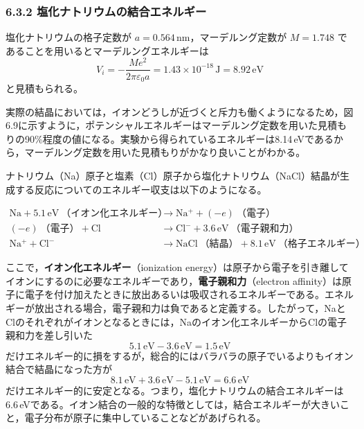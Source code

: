 \documentclass[a4paper,11pt]{ltjsarticle}
\begin{document}
\subsubsection{6.3.2 塩化ナトリウムの結合エネルギー}

塩化ナトリウムの格子定数が $a = 0.564\,\mathrm{nm}$，マーデルング定数が $M = 1.748$ であることを用いるとマーデルングエネルギーは
\begin{equation}
V_i = -\frac{Me^2}{2\pi\varepsilon_0 a} = 1.43\times10^{-18}\,\mathrm{J} = 8.92\,\mathrm{eV}
\end{equation}
と見積もられる。

実際の結晶においては，イオンどうしが近づくと斥力も働くようになるため，図6.9に示すように，ポテンシャルエネルギーはマーデルング定数を用いた見積もりの90\%程度の値になる。実験から得られているエネルギーは8.14\,eVであるから，マーデルング定数を用いた見積もりがかなり良いことがわかる。

ナトリウム（Na）原子と塩素（Cl）原子から塩化ナトリウム（NaCl）結晶が生成する反応についてのエネルギー収支は以下のようになる。

\begin{align*}
\mathrm{Na} + 5.1\,\mathrm{eV}\ \text{（イオン化エネルギー）} &\rightarrow \mathrm{Na^+} + (-e)\ \text{（電子）}\\
(-e)\ \text{（電子）} + \mathrm{Cl} &\rightarrow \mathrm{Cl^-} + 3.6\,\mathrm{eV}\ \text{（電子親和力）}\\
\mathrm{Na^+} + \mathrm{Cl^-} &\rightarrow \mathrm{NaCl}\ \text{（結晶）} + 8.1\,\mathrm{eV}\ \text{（格子エネルギー）}
\end{align*}

ここで，\textbf{イオン化エネルギー}（ionization energy）は原子から電子を引き離してイオンにするのに必要なエネルギーであり，\textbf{電子親和力}（electron affinity）は原子に電子を付け加えたときに放出あるいは吸収されるエネルギーである。エネルギーが放出される場合，電子親和力は負であると定義する。したがって，NaとClのそれぞれがイオンとなるときには，Naのイオン化エネルギーからClの電子親和力を差し引いた
\begin{equation}
5.1\,\mathrm{eV} - 3.6\,\mathrm{eV} = 1.5\,\mathrm{eV}
\end{equation}
だけエネルギー的に損をするが，総合的にはバラバラの原子でいるよりもイオン結合で結晶になった方が
\begin{equation}
8.1\,\mathrm{eV} + 3.6\,\mathrm{eV} - 5.1\,\mathrm{eV} = 6.6\,\mathrm{eV}
\end{equation}
だけエネルギー的に安定となる。つまり，塩化ナトリウムの結合エネルギーは6.6\,eVである。イオン結合の一般的な特徴としては，結合エネルギーが大きいこと，電子分布が原子に集中していることなどがあげられる。
\end{document}
